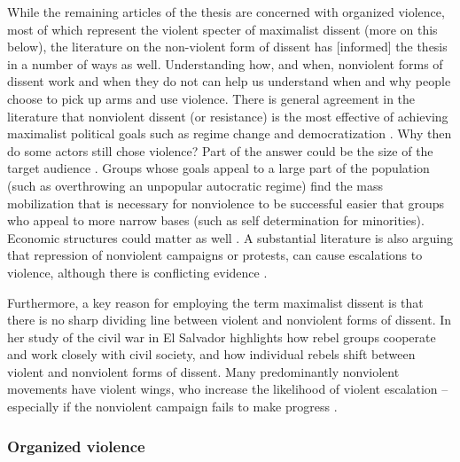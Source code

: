 While the remaining articles of the thesis are concerned with organized
violence, most of which represent the violent specter of maximalist dissent
(more on this below), the literature on the non-violent form of dissent has
[informed] the thesis in a number of ways as well. Understanding how, and when,
nonviolent forms of dissent work and when they do not can help us understand
when and why people choose to pick up arms and use violence. There is general
agreement in the literature that nonviolent dissent (or resistance) is the most
effective of achieving maximalist political goals \citep{chenoweth2011civil,
Stephan_2008} such as regime change and democratization \citep{Celestino_2013,
Bethke_2019}. Why then do some actors still chose violence? Part of the answer
could be the size of the target audience \citep{Gleditsch_2021}. Groups whose
goals appeal to a large part of the population (such as overthrowing an
unpopular autocratic regime) find the mass mobilization that is necessary for
nonviolence to be successful easier that groups who appeal to more narrow bases
(such as self determination for minorities)\citep{Gleditsch_2021}. Economic
structures could matter as well \citep{Butcher_2014}. A substantial literature
is also arguing that repression of nonviolent campaigns or protests, can cause
escalations to violence, although there is conflicting evidence
\citep{Chenoweth_2017, Lichbach_1987}.

Furthermore, a key reason for employing the term maximalist dissent is that
there is no sharp dividing line between violent and nonviolent forms of dissent.
In her study of the civil war in El Salvador \citet{Wood2003} highlights how
rebel groups cooperate and work closely with civil society, and how individual
rebels shift between violent and nonviolent forms of dissent. Many predominantly
nonviolent movements have violent wings, who increase the likelihood of
violent escalation -- especially if the nonviolent campaign fails to make
progress \citep{Ryckman_2019}.

\subsubsection{Organized violence}
\label{Organized violence}

